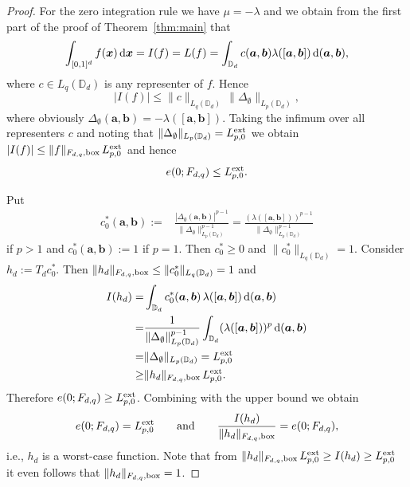 \documentclass[12pt]{article}
\theoremstyle{remark}
\theoremstyle{definition}
\newcommand{\D}{\mathbb{D}}
\newcommand{\ex}{{\rm ext}}
\newcommand{\bx}{{\rm box}}
\newcommand{\rd}{\,{\rm d}}
\newcommand{\bsx}{{\boldsymbol x}}
\newcommand{\bsa}{{\boldsymbol a}}
\newcommand{\bsb}{{\boldsymbol b}}
\newcommand{\<}{\langle}
\renewcommand{\>}{\rangle}
\begin{document}
\begin{proof}
For the zero integration rule we have $\mu=-\lambda$ and we obtain from the first part of the proof of Theorem~\ref{thm:main} that $$\int_{[0,1]^d}f(\bsx)\rd \bsx = I(f)=L(f)=\int_{\D_d} c(\bsa,\bsb) \lambda([\bsa,\bsb]) \rd (\bsa,\bsb),$$ where $c \in L_q(\D_d)$ is any representer of $f$. Hence $$|I(f)| \le \|c\|_{L_q(\D_d)} \, \|\Delta_{\emptyset}\|_{L_p(\D_d)},$$ where obviously $\Delta_{\emptyset} (\bsa,\bsb)= -\lambda([\bsa,\bsb])$. Taking the infimum over all representers $c$ and noting that $\|\Delta_{\emptyset}\|_{L_p(\D_d)} =L_{p,0}^{\ex}$ we obtain $|I(f)| \le \|f\|_{F_{d,q},\bx} \, L_{p,0}^{\ex}$ and hence 
$$e(0; F_{d,q}) \le L_{p,0}^{\ex}.$$ 

Put 
\begin{align}\label{eq:cstar0}
c_0^{\ast}(\bsa,\bsb):= & \frac{|\Delta_{\emptyset}(\bsa,\bsb)|^{p-1}}{\|\Delta_{\emptyset}\|_{L_p(\D_d)}^{p-1}}=  \frac{(\lambda([\bsa,\bsb]))^{p-1}}{\|\Delta_{\emptyset}\|_{L_p(\D_d)}^{p-1}}
\end{align}
if $p>1$ and $c_0^{\ast}(\bsa,\bsb):= 1$ if $p=1$. Then $c_0^{\ast} \ge 0$ and $\|c_0^{\ast}\|_{L_q(\D_d)}=1$. Consider $h_d:=T_d c_0^{\ast}$. Then $\|h_d\|_{F_{d,q},\bx} \le \|c_0^{\ast}\|_{L_q(\D_d)}=1$ and
\begin{align*}
I(h_d)
= & \int_{\D_d} c_0^\ast(\bsa,\bsb)\,\lambda([\bsa,\bsb])\rd (\bsa,\bsb) \\
= & \frac{1}{\|\Delta_{\emptyset}\|_{L_p(\D_d)}^{p-1}}\int_{\D_d} (\lambda([\bsa,\bsb]))^p \rd (\bsa,\bsb)\\
= & \|\Delta_{\emptyset}\|_{L_p(\D_d)} = L_{p,0}^{\ex}\\
\ge & \|h_d\|_{F_{d,q},\bx} \,L_{p,0}^{\ex}.
\end{align*}
Therefore $e(0;F_{d,q}) \ge L_{p,0}^{\ex}$. Combining with the upper bound we obtain $$e(0;F_{d,q}) = L_{p,0}^{\ex} \qquad \mbox{and}\qquad \frac{I(h_d)}{\|h_d\|_{F_{d,q},\bx}}=e(0;F_{d,q}),$$ i.e., $h_d$ is a worst-case function. 
Note that from $\|h_d\|_{F_{d,q},\bx} \,L_{p,0}^{\ex} \ge I(h_d) \ge L_{p,0}^{\ex}$ it even follows that $\|h_d\|_{F_{d,q},\bx}=1$.


\end{proof}
\end{document}
